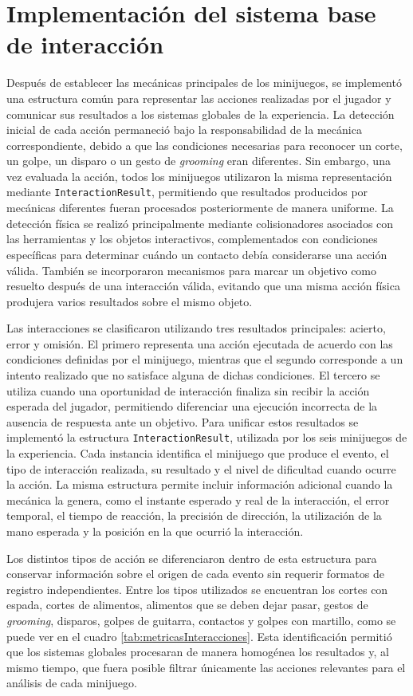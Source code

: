 \section{Implementación del sistema base de interacción}
Después de establecer las mecánicas principales de los minijuegos, 
se implementó una estructura común para representar las acciones 
realizadas por el jugador y comunicar sus resultados a los sistemas 
globales de la experiencia. La detección inicial de cada acción 
permaneció bajo la responsabilidad de la mecánica correspondiente, 
debido a que las condiciones necesarias para reconocer un corte, 
un golpe, un disparo o un gesto de \textit{grooming} eran diferentes. 
Sin embargo, una vez evaluada la acción, todos los minijuegos utilizaron 
la misma representación mediante \texttt{InteractionResult}, permitiendo 
que resultados producidos por mecánicas diferentes fueran procesados 
posteriormente de manera uniforme. La detección física se realizó 
principalmente mediante colisionadores asociados con las herramientas y 
los objetos interactivos, complementados con condiciones específicas para 
determinar cuándo un contacto debía considerarse una acción válida. 
También se incorporaron mecanismos para marcar un objetivo como resuelto 
después de una interacción válida, evitando que una misma acción física 
produjera varios resultados sobre el mismo objeto.

Las interacciones se clasificaron utilizando tres resultados principales: acierto, error y omisión.
El primero representa una acción ejecutada de acuerdo con las condiciones definidas por el minijuego,
mientras que el segundo corresponde a un intento realizado que no satisface alguna de dichas condiciones.
El tercero se utiliza cuando una oportunidad de interacción finaliza sin recibir
la acción esperada del jugador, permitiendo diferenciar una ejecución incorrecta
de la ausencia de respuesta ante un objetivo. Para unificar estos resultados
se implementó la estructura \texttt{InteractionResult}, utilizada por los seis
minijuegos de la experiencia. Cada instancia identifica el minijuego que produce
el evento, el tipo de interacción realizada, su resultado y el nivel de
dificultad cuando ocurre la acción. La misma estructura permite incluir información adicional
cuando la mecánica la genera, como el instante esperado y real de la interacción,
el error temporal, el tiempo de reacción, la precisión de dirección, la 
utilización de la mano esperada y la posición en la que ocurrió la interacción.

Los distintos tipos de acción se diferenciaron dentro de esta estructura
para conservar información sobre el origen de cada evento sin requerir 
formatos de registro independientes. Entre los tipos utilizados se encuentran
los cortes con espada, cortes de alimentos, alimentos que se deben dejar pasar,
gestos de \textit{grooming}, disparos, golpes de guitarra, contactos y golpes con martillo,
como se puede ver en el cuadro \ref{tab:metricasInteracciones}.
Esta identificación permitió que los sistemas globales procesaran de manera
homogénea los resultados y, al mismo tiempo, que fuera posible filtrar
únicamente las acciones relevantes para el análisis de cada minijuego.

